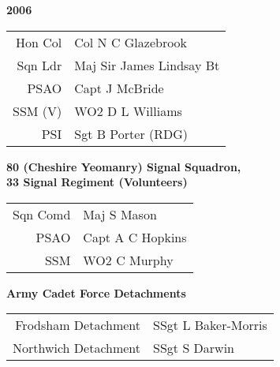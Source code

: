 \begin{center}
  \Huge
  \textbf{2006}
\end{center}

\begin{center}
  \small
  \begin{tabular}{rl}
    Hon Col & Col N C Glazebrook \\
    Sqn Ldr & Maj Sir James Lindsay Bt \\
    PSAO & Capt J McBride \\
    SSM (V) & WO2 D L Williams \\
    PSI & Sgt B Porter (RDG) \\
  \end{tabular}
\end{center}

\begin{center}
  \Large
  \textbf{80 (Cheshire Yeomanry) Signal Squadron, \\ 33 Signal Regiment (Volunteers)}
\end{center}

\begin{center}
  \small
  \begin{tabular}{rl}
    Sqn Comd & Maj S Mason \\
    PSAO & Capt A C Hopkins \\
    SSM & WO2 C Murphy \\
  \end{tabular}
\end{center}

\begin{center}
  \Large
  \textbf{Army Cadet Force Detachments}
\end{center}

\begin{center}
  \small
  \begin{tabular}{rl}
    Frodsham Detachment & SSgt L Baker-Morris \\
    Northwich Detachment & SSgt S Darwin \\
  \end{tabular}
\end{center}

\vspace{50mm}

\pagebreak
